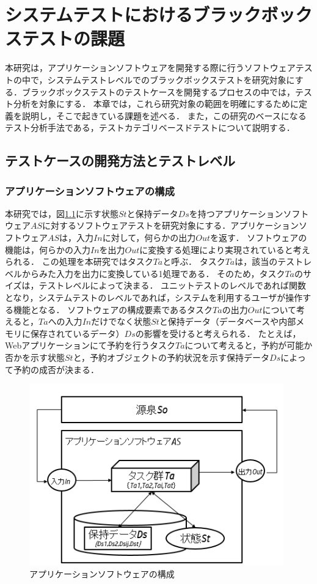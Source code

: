 \chapter{システムテストにおけるブラックボックステストの課題}
本研究は，アプリケーションソフトウェアを開発する際に行うソフトウェアテストの中で，システムテストレベルでのブラックボックステストを研究対象にする．ブラックボックステストのテストケースを開発するプロセスの中では，テスト分析を対象にする．
本章では，これら研究対象の範囲を明確にするために定義を説明し，そこで起きている課題を述べる．
また，この研究のベースになるテスト分析手法である，テストカテゴリベースドテストについて説明する．

\newpage
\section{テストケースの開発方法とテストレベル}
\subsection{アプリケーションソフトウェアの構成}
本研究では，図\ref{fig:fig-1}に示す状態$St$と保持データ$Ds$を持つアプリケーションソフトウェア$AS$に対するソフトウェアテストを研究対象にする．アプリケーションソフトウェア$AS$は，入力$In$に対して，何らかの出力$Out$を返す．
ソフトウェアの機能は，何らかの入力$In$を出力$Out$に変換する処理により実現されていると考えられる．
この処理を本研究ではタスク$Ta$と呼ぶ\cite{yumoto2017ICST}．
タスク$Ta$は，該当のテストレベルからみた入力を出力に変換している1処理である．
そのため，タスク$Ta$のサイズは，テストレベルによって決まる．
ユニットテストのレベルであれば関数となり，システムテストのレベルであれば，システムを利用するユーザが操作する機能となる．
ソフトウェアの構成要素であるタスク$Ta$の出力$Out$について考えると，$Ta$への入力$In$だけでなく状態$St$と保持データ（データベースや内部メモリに保存されているデータ）$Ds$の影響を受けると考えられる．
たとえば，Webアプリケーションにて予約を行うタスク$Ta$について考えると，予約が可能か否かを示す状態$St$と，予約オブジェクトの予約状況を示す保持データ$Ds$によって予約の成否が決まる．

\begin{figure}[H]
  \begin{center}
  \includegraphics[width=11cm]{./image/fig-1.png}
  \caption{アプリケーションソフトウェアの構成}
  \label{fig:fig-1}
  \end{center}
\end{figure}

